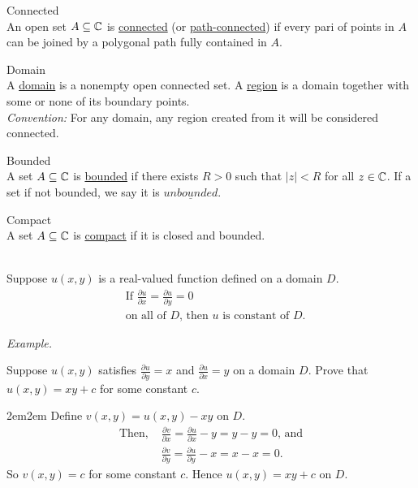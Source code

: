\documentclass[10pt]{paper}
\newcommand{\gspc}{\vspace{0.13cm}} %
\newcommand{\gline}[0]{\gspc\\} %
\newcommand{\ul}[1]{\underline{#1}}
\let\endoldproof\endproof
\renewenvironment{proof}[1][\proofname]
  {\vspace{0.2cm}\begin{adjustwidth}{2em}{2em}
   \oldproof[#1]}
  {\endoldproof
\end{adjustwidth}}
\renewenvironment{example}{
  \begin{tcolorbox}[colback=gray!2, colframe=gray!40!white, coltitle=green!20!black, boxrule=3pt, sharp corners]
    \textit{Example. }
}{\end{tcolorbox}}
\begin{document}
\begin{definition}{Connected}{}\gline{}
  An open set $A\subseteq \mathbb{C}$ is \ul{connected} (or \ul{path-connected}) if every pari of points in $A$ can be joined by a polygonal path fully contained in $A$.
\end{definition}
\begin{definition}{Domain}{}\gline{}
  A \ul{domain} is a nonempty open connected set. A \ul{region} is a domain together with some or none of its boundary points.\gline{}
  \textit{Convention: }For any domain, any region created from it will be considered connected. 
\end{definition}
\begin{definition}{Bounded}{}\gline{}
  A set $A\subseteq \mathbb{C}$ is \ul{bounded} if there exists $R > 0$ such that $|z|<R$ for all $z\in \mathbb{C}$. If a set if not bounded, we say it is $\ul{unbounded}$. 
\end{definition}
\begin{definition}{Compact}{}\gline{}
  A set $A\subseteq \mathbb{C}$ is \ul{compact} if it is closed and bounded. 
\end{definition}
\begin{theorem}{}{}\gline{}
  Suppose $u(x,y)$ is a real-valued function defined on a domain $D$. 
  \begin{align*}
    &\text{If }\frac{\partial u}{\partial x}=\frac{\partial u}{\partial y}=0\\
    &\text{on all of }D\text{, then }u\text{ is constant of }D.
  \end{align*}
  \begin{example}
    Suppose $u(x,y)$ satisfies $\frac{\partial u}{\partial y}= x$ and $\frac{\partial u}{\partial x} = y$ on a domain $D$. Prove that $u(x,y) = xy+c$ for some constant $c$. 
    \begin{proof}
      Define $v(x,y) = u(x,y)-xy$ on $D$.
      \begin{align*}
        \text{Then, }&\frac{\partial v}{\partial x}=\frac{\partial u}{\partial x}-y = y-y = 0\text{, and}\\
        &\frac{\partial v}{\partial y}=\frac{\partial u}{\partial y}-x = x-x = 0.
      \end{align*} 
      So $v(x,y) = c$ for some constant $c$. Hence $u(x,y) = xy+c$ on $D$.
    \end{proof}
  \end{example}
\end{theorem}
\end{document}
